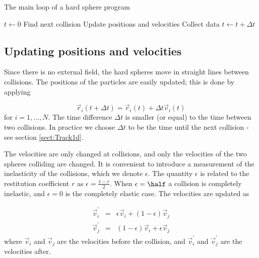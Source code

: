 \begin{algorithm}
  \caption[Hard sphere MD program]{The main loop of a hard sphere program}
  \label{prg:HSmain}
  \begin{algorithmic}
    \STATE $t \leftarrow 0$
      \STATE Find next collision 
      \STATE Update positions and velocities
      \STATE Collect data
      \STATE $t \leftarrow t+\Delta t$
    \ENDWHILE
  \end{algorithmic}
\end{algorithm}


\subsection{Updating positions and velocities}
Since there is no external field, the hard spheres move in straight
lines between collisions. The positions of the particles are easily
updated; this is done by applying

\begin{equation}
\label{eq:HSeom1}
  \vec{r}_i(t+\Delta t) = \vec{r}_i(t) + \Delta t\vec{v}_i(t)
\end{equation}
for $i=1,\ldots, N$. The time difference $\Delta t$ is smaller (or
equal) to the time between two collisions. In practice we choose
$\Delta t$ to be the time until the next collision - see section
\ref{sect:Track1d}.

The velocities are only changed at collisions, and only the velocities
of the two spheres colliding are changed. It is convenient to
introduce a measurement of the inelasticity of the
collisions, which we denote $\epsilon$. The quantity $\epsilon$ is
related to the restitution coefficient $r$ as
$\epsilon=\frac{1-r}{2}$. When $\epsilon = \half$ a collision is
completely inelastic, and $\epsilon = 0$ is the completely elastic
case. The velocities are updated as

\begin{subequations}
  \begin{eqnarray}
    \vec{v}_i^{\prime} &=& \epsilon\vec{v}_i + (1-\epsilon)\vec{v}_j \\
    \vec{v}_j^{\prime} &=& (1-\epsilon)\vec{v}_i + \epsilon\vec{v}_j 
  \end{eqnarray}
\end{subequations}
where $\vec{v}_i$ and $\vec{v}_j$ are the velocities before the
collision, and $\vec{v}_i^{\prime}$ and $\vec{v}_j^{\prime}$ are the
velocities after.


